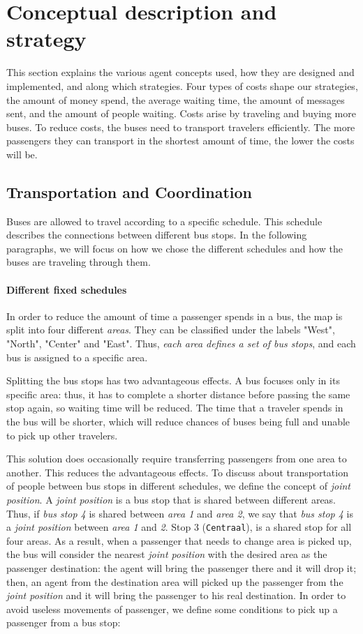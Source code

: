 \section{Conceptual description and strategy}
\label{sec:conceptual}
This section explains the various agent concepts used, how they are designed and implemented, and along which strategies. Four types of costs shape our strategies, the amount of money spend, the average waiting time, the amount of messages sent, and the amount of people waiting. Costs arise by traveling and buying more buses. To reduce costs, the buses need to transport travelers efficiently. The more passengers they can transport in the shortest amount of time, the lower the costs will be.

\subsection{Transportation and Coordination}
Buses are allowed to travel according to a specific schedule. This schedule describes the connections between different bus stops. In the following paragraphs, we will focus on how we chose the different schedules and how the buses are traveling through them.
 
\paragraph{Different fixed schedules}

In order to reduce the amount of time a passenger spends in a bus, the map is split into four different \textit{areas}. They can be classified under the labels "West", "North", "Center" and "East". Thus, \textit{each area defines a set of bus stops}, and each bus is assigned to a specific area.

Splitting the bus stops has two advantageous effects. A bus focuses only in its specific area: thus, it has to complete a shorter distance before passing the same stop again, so waiting time will be reduced. The time that a traveler spends in the bus will be shorter, which will reduce chances of buses being full and unable to pick up other travelers.

This solution does occasionally require transferring passengers from one area to another. This reduces the advantageous effects. To discuss about transportation of people between bus stops in different schedules, we define the concept of \textit{joint position}. A \textit{joint position} is a bus stop that is shared between different areas. Thus, if \textit{bus stop 4} is shared between \textit{area 1} and \textit{area 2}, we say that \textit{bus stop 4} is a \textit{joint position}  between \textit{area 1} and \textit{2}. Stop 3 (\texttt{Centraal}), is a shared stop for all four areas. As a result, when a passenger that needs to change area is picked up, the bus will consider the nearest \textit{joint position} with the desired area as the passenger destination: the agent will bring the passenger there and it will drop it; then, an agent from the destination area will picked up the passenger from the \textit{joint position} and it will bring the passenger to his real destination. In order to avoid useless movements of passenger, we define some conditions to pick up a passenger from a bus stop:

